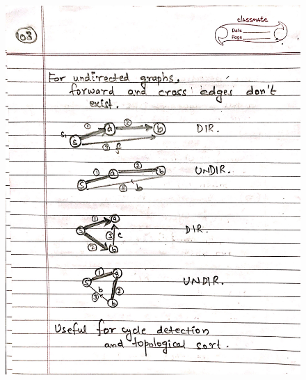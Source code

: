 \begin{figure}[H]
    \centering
    \includegraphics[width=16cm, height=21cm]{"./MIT-6.006/MIT-6006-103"}
\end{figure}
\newpage
